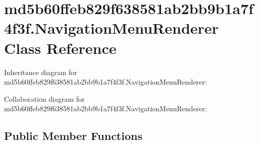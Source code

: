 \hypertarget{classmd5b60ffeb829f638581ab2bb9b1a7f4f3f_1_1_navigation_menu_renderer}{}\section{md5b60ffeb829f638581ab2bb9b1a7f4f3f.\+Navigation\+Menu\+Renderer Class Reference}
\label{classmd5b60ffeb829f638581ab2bb9b1a7f4f3f_1_1_navigation_menu_renderer}


Inheritance diagram for md5b60ffeb829f638581ab2bb9b1a7f4f3f.\+Navigation\+Menu\+Renderer\+:


Collaboration diagram for md5b60ffeb829f638581ab2bb9b1a7f4f3f.\+Navigation\+Menu\+Renderer\+:
\subsection*{Public Member Functions}
